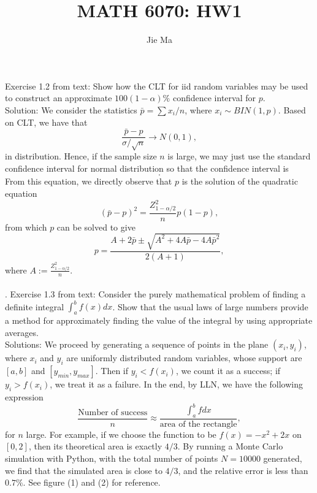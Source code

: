 \documentclass[11pt]{article} \pagestyle{plain}
\def\beq{\begin{equation}}
\def\eeq{\end{equation}}
\begin{document}
\title{MATH 6070: HW1}
\author{Jie Ma}
\maketitle{}


\noindent Exercise 1.2 from text: Show how the CLT for iid random variables may be used to construct an approximate $100(1-\alpha)\%$ confidence interval for $p$. \\

\noindent Solution: We consider the statistics $\bar{p} = \sum x_{i}/n$, where $x_{i}\sim BIN(1,p)$. Based on CLT, we have that 
\beq \frac{\bar{p}-p}{\sigma/\sqrt{n}} \to N(0,1),\eeq in distribution. Hence, if the sample size $n$ is large, we may just use the standard confidence interval for normal distribution so that the confidence interval is 
\beq [-z_{1-\alpha/2}<\frac{\bar{p}-p}{\sqrt{p(1-p)/n}}<z_{1-\alpha/2}].\eeq From this equation, we directly observe that $p$ is the solution of the quadratic equation \beq (\bar{p}-p)^{2} = \frac{Z_{1-\alpha/2}^{2}}{n}p(1-p),\eeq from which $p$ can be solved to give \beq p = \frac{A+2\bar{p}\pm \sqrt{A^{2}+4A\bar{p}-4A\bar{p}^{2}}}{2(A+1)},\eeq where $A:= \frac{Z_{1-\alpha/ 2}^{2}}{n}$.\\\\


. Exercise 1.3 from text: Consider the purely mathematical problem of finding a definite integral $\int_{a}^{b}f(x)dx$. Show that the usual laws of large numbers provide a method for approximately finding the value of the integral by using appropriate averages. \\

\noindent Solutions: We proceed by generating a sequence of points in the plane $(x_{i},y_{i})$, where $x_{i}$ and $y_{i}$ are uniformly distributed random variables, whose support are $[a,b]$ and $[y_{min},y_{max}]$. Then if $y_{i}< f(x_{i})$, we count it as a success; if $y_{i} > f(x_{i})$, we treat it as a failure. In the end, by LLN, we have the following expression
\beq \frac{\text{Number of success}}{n}\approx\frac{\int_{a}^{b}fdx}{\text{area of the rectangle}},\eeq
for $n$ large. For example, if we choose the function to be $f(x) = -x^{2} +2x$ on $[0,2]$, then its theoretical area is exactly $4/3$. By running a Monte Carlo simulation with Python, with the total number of points $ N = 10000$ generated, we find that the simulated area is close to $4/3$, and the relative error is less than $0.7\%$. See figure (1) and (2) for reference. \\
\end{document}
